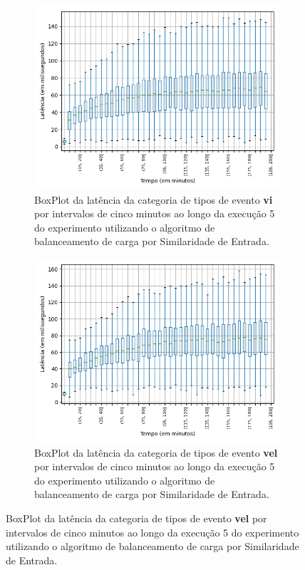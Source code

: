 \begin{figure}
\begin{subfigure}{.5\textwidth}
\centering
\includegraphics[width=\textwidth]{figuras/graphics/boxplot_10-dez-is_vi.png}
\caption{BoxPlot da latência da categoria de tipos de evento \textbf{vi} por intervalos de cinco minutos ao longo da execução 5 do experimento utilizando o algoritmo de balanceamento de carga por Similaridade de Entrada.}
\label{fig:BoxPlot_vi_IS_10-dez-is}
\end{subfigure}%
\centering
\begin{subfigure}{.5\textwidth}
\centering
\includegraphics[width=\textwidth]{figuras/graphics/boxplot_10-dez-is_vel.png}
\caption{BoxPlot da latência da categoria de tipos de evento \textbf{vel} por intervalos de cinco minutos ao longo da execução 5 do experimento utilizando o algoritmo de balanceamento de carga por Similaridade de Entrada.}
\label{fig:BoxPlot_vel_IS_10-dez-is}
\end{subfigure}%


\end{figure}

